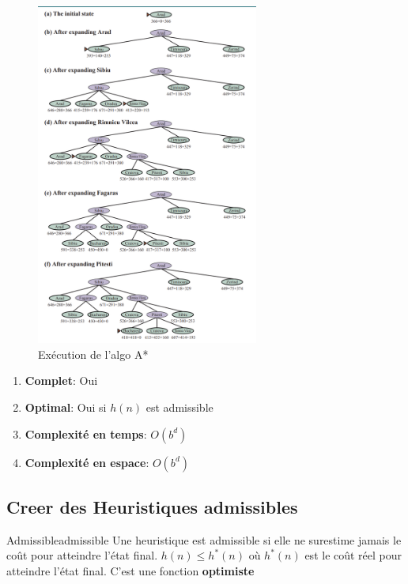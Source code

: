 \documentclass[a4paper, 12pt]{extarticle}
\begin{document}
\begin{figure}[H]
    \begin{center}
        \includegraphics[width=0.65\textwidth]{./pictures/astar.png}
    \end{center}
    \caption{Exécution de l'algo A*}\label{fig:astar}
\end{figure}

\begin{remarks}\leavevmode
    \begin{enumerate}
        \item \textbf{Complet}: Oui
        \item \textbf{Optimal}: Oui si $h(n)$ est admissible
        \item \textbf{Complexité en temps}: $O(b^d)$
        \item \textbf{Complexité en espace}: $O(b^d)$
    \end{enumerate}
\end{remarks}

\subsection{Creer des Heuristiques admissibles} %
\label{sub:creer_des_heuristiques_admissibles}

\begin{definition}{Admissible}{admissible}
    Une heuristique est admissible si elle ne surestime jamais le coût pour atteindre l'état final. 
    \begin{math}
        h(n) \leq h^*(n) 
    \end{math} 
    où $h^*(n)$ est le coût réel pour atteindre l'état final. 
    C'est une fonction \textbf{optimiste}
\end{definition}
\end{document}
